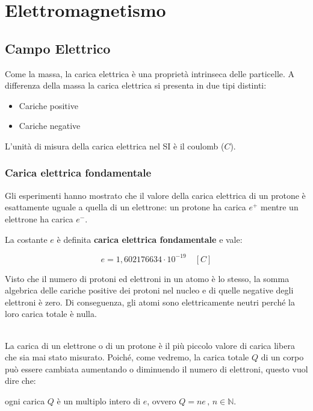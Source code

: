 \part{Elettromagnetismo}


\chapter{Campo Elettrico}

Come la massa, la carica elettrica è una proprietà intrinseca delle particelle. A
differenza della massa la carica elettrica si presenta in due tipi distinti:

\begin{itemize}
    \item Cariche positive
    \item Cariche negative
\end{itemize}

L’unità di misura della carica elettrica nel SI è il coulomb ($C$).

\section{Carica elettrica fondamentale}
Gli esperimenti hanno mostrato che il valore della carica elettrica di un protone
è esattamente uguale a quella di un elettrone: un protone ha carica $e^+$ mentre un
elettrone ha carica $e^-$.

La costante $e$ è definita \textbf{carica elettrica fondamentale} e vale:

\begin{equation}
    e = 1,602176634 \cdot 10^{-19} \quad[C]
\end{equation}

Visto che il numero di protoni ed elettroni in un atomo è lo stesso, la somma
algebrica delle cariche positive dei protoni nel nucleo e di quelle negative degli
elettroni è zero. Di conseguenza,
gli atomi sono elettricamente neutri perché la loro carica totale è nulla.
\paragraph{}
La carica di un elettrone o di un protone è il più piccolo valore di carica libera che
sia mai stato misurato. Poiché, come vedremo, la carica totale $Q$ di un corpo può
essere cambiata aumentando o diminuendo il numero di elettroni, questo vuol
dire che:

ogni carica $Q$ è un multiplo intero di $e$, ovvero $Q = ne\,,\,n \in \mathbb{N}$.

